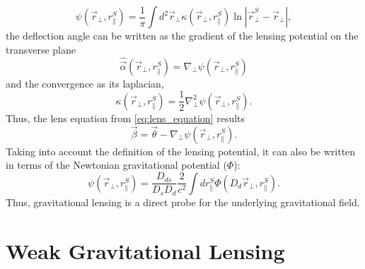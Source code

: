 \begin{equation}
\psi(\vec r_\perp,r_\parallel^S) = \frac1{\pi}\int d^2\vec r_\perp\kappa(\vec r_\perp,r_\parallel^S)\ln|\vec r^S_\perp-\vec r_\perp|,
\end{equation}
the deflection angle can be written as the gradient of the lensing potential on the transverse plane
\begin{equation}
\hat\vec\alpha(\vec r_\perp,r_\parallel^S) = \nabla_\perp\psi(\vec r_\perp,r_\parallel^S)
\end{equation}
and the convergence as its laplacian,
\begin{equation}
\kappa(\vec r_\perp,r_\parallel^S)=\frac{1}{2}\nabla^2_\perp\psi(\vec r_\perp,r_\parallel^S).
\end{equation}
Thus, the lens equation from \autoref{eq:lens_equation} results
\begin{equation}
\vec\beta = \vec\theta-\nabla_\perp\psi(\vec r_\perp,r_\parallel^S).
\label{eq:lens_equation_2d}
\end{equation}
Taking into account the definition of the lensing potential, it can also be written in terms of the Newtonian gravitational potential ($\Phi$):
\begin{equation}
\psi(\vec r_\perp,r_\parallel^S) = \frac{D_{ds}}{D_sD_d}\frac{2}{c^2}\int dr_\parallel^S\Phi(D_d\vec r_\perp,r_\parallel^S).
\end{equation}
Thus, gravitational lensing is a direct probe for the underlying gravitational field.

\section{Weak Gravitational Lensing}

